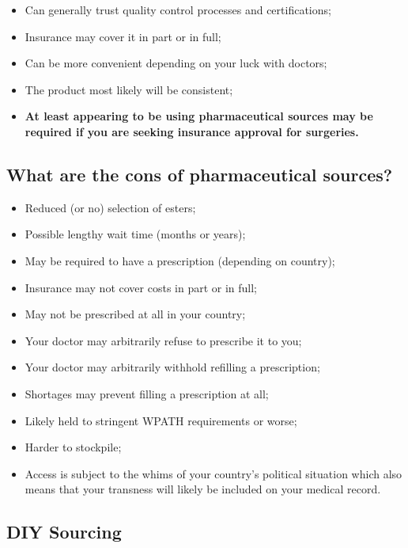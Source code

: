 \documentclass{article}
\begin{document}
\begin{itemize}
  \item Can generally trust quality control processes and certifications;
  \item Insurance may cover it in part or in full;
  \item Can be more convenient depending on your luck with doctors;
  \item The product most likely will be consistent;
  \item \textbf{At least appearing to be using pharmaceutical sources may be required if you are seeking insurance approval for surgeries.}
\end{itemize}

\subsection{What are the cons of pharmaceutical sources?}

\begin{itemize}
  \item Reduced (or no) selection of esters;
  \item Possible lengthy wait time (months or years);
  \item May be required to have a prescription (depending on country);
  \item Insurance may not cover costs in part or in full;
  \item May not be prescribed at all in your country;
  \item Your doctor may arbitrarily refuse to prescribe it to you;
  \item Your doctor may arbitrarily withhold refilling a prescription;
  \item Shortages may prevent filling a prescription at all;
  \item Likely held to stringent WPATH requirements or worse;
  \item Harder to stockpile;
  \item Access is subject to the whims of your country’s political situation which also means that your transness will likely be included on your medical record.
\end{itemize}

\subsection*{DIY Sourcing}
\end{document}
